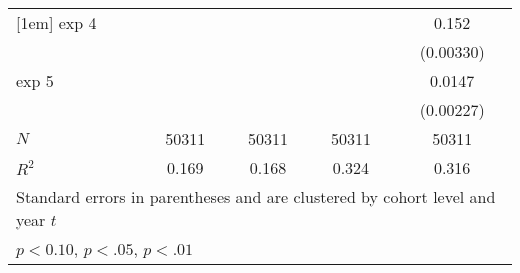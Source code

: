 \begin{table}[ht]
{\begin{tabular}{l*{4}{c}}
[1em]
exp 4       &                     &                     &                     &       0.152\sym{***}\\
            &                     &                     &                     &   (0.00330)         \\
[1em]
exp 5       &                     &                     &                     &      0.0147\sym{***}\\
            &                     &                     &                     &   (0.00227)         \\
\hline
\(N\)       &       50311         &       50311         &       50311         &       50311         \\
\(R^{2}\)   &       0.169         &       0.168         &       0.324         &       0.316         \\
\hline\hline
\multicolumn{5}{l}{\footnotesize Standard errors in parentheses and are clustered by cohort level and year $t$}\\
\multicolumn{5}{l}{\footnotesize \sym{*} \(p<0.10\), \sym{**} \(p<.05\), \sym{***} \(p<.01\)}\\
\end{tabular}
}
\end{table}